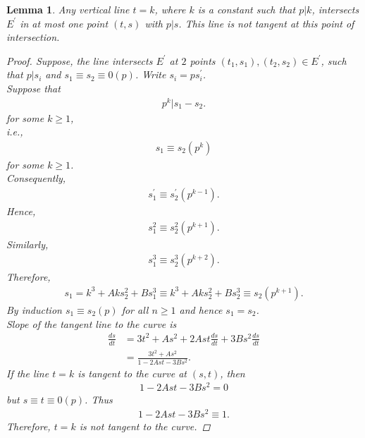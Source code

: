 \documentclass[12pt,leqno]{amsart}
\newcommand{\<}{\langle}
\renewcommand{\>}{\rangle}
\newtheorem{lemma}{Lemma}
\theoremstyle{definition}
\numberwithin{equation}{section}
\begin{document}
\begin{lemma}\label{lemma 4}
Any vertical line $t=k$, where $k$ is a constant such that $p\vert k$, intersects $E^{'}$ in at most one point $(t,s)$ with $p\vert s$. This line is not tangent at this point of intersection.
\begin{proof}
    Suppose, the line intersects $E^{'}$ at $2$ points $(t_1,s_1),(t_2,s_2)\in E^{'}$, such that $p\vert s_i$ and $s_1\equiv s_2\equiv 0(p)$. Write $s_i=ps_i^{'}$.\\
    \smallskip
    Suppose that
    \begin{align*}
        p^k\vert s_1-s_2  .
    \end{align*}for some $k\geq 1$,\\
    i.e.,
    \begin{align*}
        s_1\equiv s_2(p^k) 
    \end{align*}for some $k\geq 1$.\\
    Consequently,
    \begin{align*}
        s_1^{'}\equiv s_2^{'}(p^{k-1}).
    \end{align*}
    Hence,\\
    \smallskip
    \begin{align*}
        s_1^2\equiv s_2^2(p^{k+1}).
    \end{align*}
    Similarly,
    \begin{align*}
         s_1^3\equiv s_2^3(p^{k+2}).
    \end{align*}
    Therefore,
    \begin{align*}
        s_1=k^3+Aks_2^2+Bs_1^3\equiv k^3+Aks_2^2+Bs_2^3\equiv s_2(p^{k+1}).
    \end{align*}
    By induction $s_1\equiv s_2(p)$ for all $n\geq 1$ and hence $s_1=s_2$.\\
    Slope of the tangent line to the curve is 
    \begin{align*}
        \frac{ds}{dt}&=3t^2+As^2+2Ast\frac{ds}{dt}+3Bs^2\frac{ds}{dt}\\
        &=\frac{3t^2+As^2}{1-2Ast-3Bs^2}.
    \end{align*}
    If the line $t=k$ is tangent to the curve at $(s,t)$, then\\
    \begin{align*}
        1-2Ast-3Bs^2=0
    \end{align*} 
    but $s\equiv t\equiv 0(p)$. Thus
    \begin{align*}
        1-2Ast-3Bs^2\equiv 1.%
    \end{align*}
    Therefore, $t=k$ is not tangent to the curve.
    
\end{proof}
    
\end{lemma}
\end{document}
